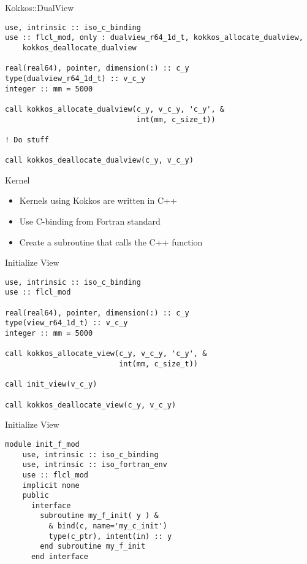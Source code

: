\begin{frame}[containsverbatim]{Kokkos::DualView}
  \begin{verbatim}
use, intrinsic :: iso_c_binding
use :: flcl_mod, only : dualview_r64_1d_t, kokkos_allocate_dualview,
    kokkos_deallocate_dualview

real(real64), pointer, dimension(:) :: c_y
type(dualview_r64_1d_t) :: v_c_y
integer :: mm = 5000

call kokkos_allocate_dualview(c_y, v_c_y, 'c_y', &
                              int(mm, c_size_t))

! Do stuff

call kokkos_deallocate_dualview(c_y, v_c_y)
  \end{verbatim}
\end{frame}

\begin{frame}{Kernel}
  \begin{itemize}
    \item Kernels using Kokkos are written in C++
    \item Use C-binding from Fortran standard 
    \item Create a subroutine that calls the C++ function
  \end{itemize}
\end{frame}

\begin{frame}[containsverbatim]{Initialize View}
  \begin{verbatim}
use, intrinsic :: iso_c_binding
use :: flcl_mod

real(real64), pointer, dimension(:) :: c_y
type(view_r64_1d_t) :: v_c_y
integer :: mm = 5000

call kokkos_allocate_view(c_y, v_c_y, 'c_y', &
                          int(mm, c_size_t))

call init_view(v_c_y)

call kokkos_deallocate_view(c_y, v_c_y)
  \end{verbatim}
\end{frame}

\begin{frame}[containsverbatim]{Initialize View}
  \begin{verbatim}
module init_f_mod
    use, intrinsic :: iso_c_binding
    use, intrinsic :: iso_fortran_env
    use :: flcl_mod
    implicit none
    public
      interface
        subroutine my_f_init( y ) &
          & bind(c, name='my_c_init')
          type(c_ptr), intent(in) :: y
        end subroutine my_f_init
      end interface
  \end{verbatim}
\end{frame}

